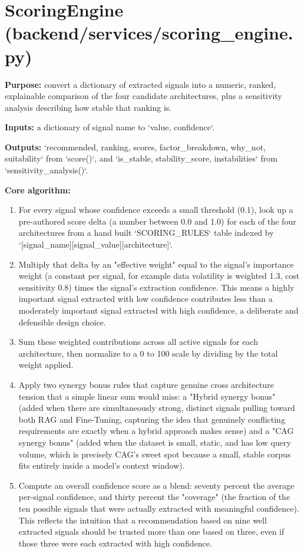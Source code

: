 \documentclass[11pt,a4paper]{report}
\begin{document}
\section{ScoringEngine (backend/services/scoring\_engine.py)}

\textbf{Purpose:} convert a dictionary of extracted signals into a numeric, ranked, explainable comparison of the four candidate architectures, plus a sensitivity analysis describing how stable that ranking is.

\textbf{Inputs:} a dictionary of signal name to `{value, confidence}`.

\textbf{Outputs:} `{recommended, ranking, scores, factor_breakdown, why_not, suitability}` from `score()`, and `{is_stable, stability_score, instabilities}` from `sensitivity_analysis()`.

\textbf{Core algorithm:}
\begin{enumerate}[leftmargin=*]
  \item For every signal whose confidence exceeds a small threshold (0.1), look up a pre-authored score delta (a number between 0.0 and 1.0) for each of the four architectures from a hand built `SCORING_RULES` table indexed by `[signal_name][signal_value][architecture]`.
  \item Multiply that delta by an "effective weight" equal to the signal's importance weight (a constant per signal, for example data volatility is weighted 1.3, cost sensitivity 0.8) times the signal's extraction confidence. This means a highly important signal extracted with low confidence contributes less than a moderately important signal extracted with high confidence, a deliberate and defensible design choice.
  \item Sum these weighted contributions across all active signals for each architecture, then normalize to a 0 to 100 scale by dividing by the total weight applied.
  \item Apply two synergy bonus rules that capture genuine cross architecture tension that a simple linear sum would miss: a "Hybrid synergy bonus" (added when there are simultaneously strong, distinct signals pulling toward both RAG and Fine-Tuning, capturing the idea that genuinely conflicting requirements are exactly when a hybrid approach makes sense) and a "CAG synergy bonus" (added when the dataset is small, static, and has low query volume, which is precisely CAG's sweet spot because a small, stable corpus fits entirely inside a model's context window).
  \item Compute an overall confidence score as a blend: seventy percent the average per-signal confidence, and thirty percent the "coverage" (the fraction of the ten possible signals that were actually extracted with meaningful confidence). This reflects the intuition that a recommendation based on nine well extracted signals should be trusted more than one based on three, even if those three were each extracted with high confidence.
\end{enumerate}
\end{document}

